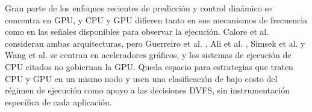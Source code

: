 Gran parte de los enfoques recientes de predicción y control dinámico se concentra en GPU, y CPU y GPU difieren tanto en sus mecanismos de frecuencia como en las señales disponibles para observar la ejecución. Calore et al. \cite{Calore2017} consideran ambas arquitecturas, pero Guerreiro et al. \cite{Guerreiro2019}, Ali et al. \cite{Ali2023}, Simsek et al. \cite{Simsek2024} y Wang et al. \cite{Wang2024} se centran en aceleradores gráficos, y los sistemas de ejecución de CPU citados no gobiernan la GPU. Queda espacio para estrategias que traten CPU y GPU en un mismo nodo y usen una clasificación de bajo costo del régimen de ejecución como apoyo a las decisiones DVFS, sin instrumentación específica de cada aplicación.